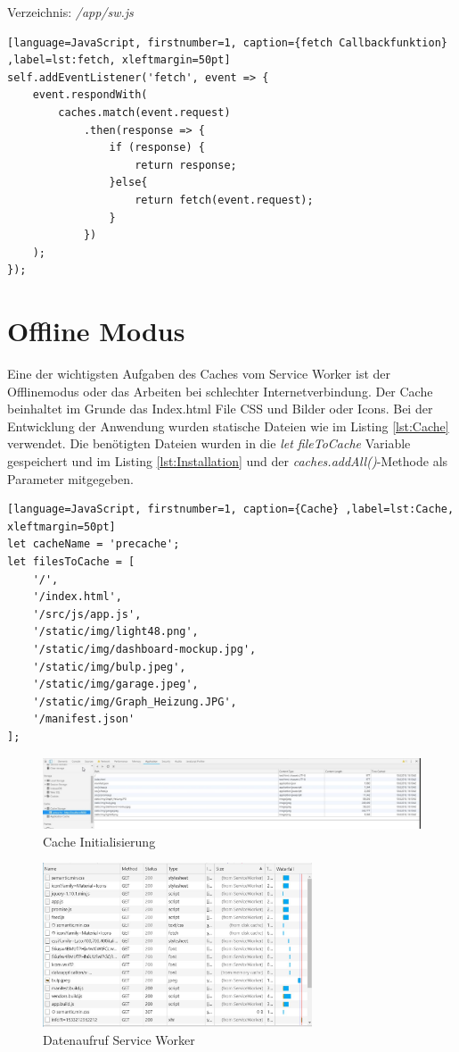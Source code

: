 Verzeichnis: \textit{/app/sw.js}

\begin{lstlisting}[language=JavaScript, firstnumber=1, caption={fetch Callbackfunktion} ,label=lst:fetch, xleftmargin=50pt]
self.addEventListener('fetch', event => {
    event.respondWith(
        caches.match(event.request)
            .then(response => {
                if (response) {
                    return response;
                }else{
                    return fetch(event.request);
                }
            })
    );
});
\end{lstlisting}


	 
\clearpage
\section{Offline Modus}
Eine der wichtigsten Aufgaben des Caches vom Service Worker ist der Offlinemodus oder das Arbeiten bei schlechter Internetverbindung. Der Cache beinhaltet im Grunde das Index.html File CSS und Bilder oder Icons. Bei der Entwicklung der Anwendung wurden statische Dateien wie im Listing \ref{lst:Cache} verwendet. Die benötigten Dateien wurden in die \textit{let fileToCache} Variable gespeichert und im Listing \ref{lst:Installation} und der \textit{caches.addAll()}-Methode als Parameter mitgegeben.


\begin{lstlisting}[language=JavaScript, firstnumber=1, caption={Cache} ,label=lst:Cache, xleftmargin=50pt]
let cacheName = 'precache';
let filesToCache = [
    '/',
    '/index.html',
    '/src/js/app.js',
    '/static/img/light48.png',
    '/static/img/dashboard-mockup.jpg',
    '/static/img/bulp.jpeg',
    '/static/img/garage.jpeg',
    '/static/img/Graph_Heizung.JPG',
    '/manifest.json'
];
\end{lstlisting}


\begin{figure}[H]
	\centering
	\includegraphics[width=16cm]{BilderAllgemein/Implementierung/Cache.jpg}\medskip
	\caption{Cache Initialisierung}
	\label{fig:Cache}
\end{figure}  

\begin{figure}[H]
	\centering
	\includegraphics[width=8cm]{BilderAllgemein/Implementierung/aufruf_SW_Browser.jpg}\medskip
	\caption{Datenaufruf Service Worker}
	\label{fig:aufrufSWBrowser}
\end{figure}  

